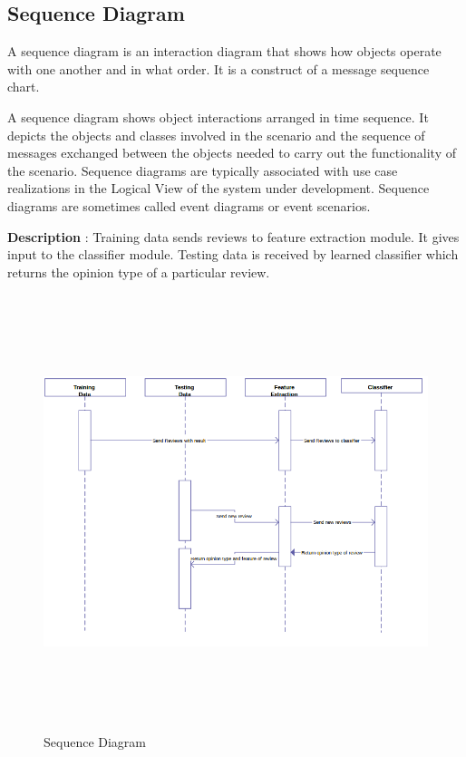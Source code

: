 \documentclass[oneside,a4paper,12pt]{pictreport}
\begin{document}
\newpage

\subsection{Sequence Diagram}
A sequence diagram is an interaction diagram that shows how objects operate
with one another and in what order. It is a construct of a message sequence chart.

A sequence diagram shows object interactions arranged in time sequence. 
It depicts the objects and classes involved in the scenario and the sequence
of messages exchanged between the objects needed to carry out the functionality 
of the scenario. Sequence diagrams are typically associated with use case 
realizations in the Logical View of the system under development. 
Sequence diagrams are sometimes called event diagrams or event scenarios.

\textbf{Description} : Training data sends reviews to feature extraction module.
It gives input to the classifier module. Testing data is received by learned classifier which 
returns the opinion type of a particular review.
\vspace{4mm}
\begin{figure}[h!]
\includegraphics[width=6.0in,height=5.0in]{sequence.png}
\caption{Sequence Diagram}
\end{figure}
\end{document}
